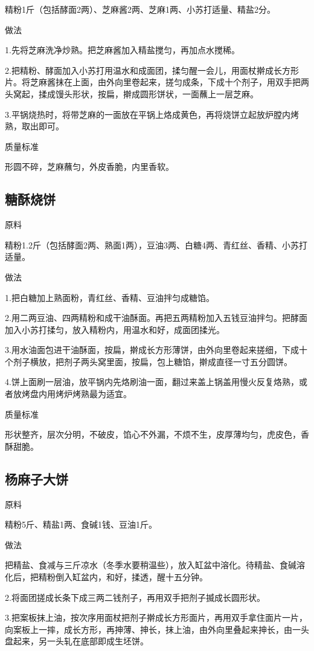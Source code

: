 \documentclass{ctexbook}
\begin{document}
精粉1斤（包括酵面2两）、芝麻酱2两、芝麻1两、小苏打适量、精盐2分。

做法

1.先将芝麻洗净炒熟。把芝麻酱加入精盐搅匀，再加点水搅稀。

2.把精粉、酵面加入小苏打用温水和成面团，揉匀醒一会儿，用面杖擀成长方形片。将芝麻酱抹在上面，由外向里卷起来，搓匀成条，下成十个剂子，用双手把两头窝起，揉成馒头形状，按扁，擀成圆形饼状，一面蘸上一层芝麻。

3.平锅烧热时，将带芝麻的一面放在平锅上烙成黄色，再将烧饼立起放炉膛内烤熟，取出即可。

质量标准

形圆不碎，芝麻蘸匀，外皮香脆，内里香软。
\subsection{糖酥烧饼}
原料

精粉1.2斤（包括酵面2两、熟面1两），豆油3两、白糖4两、青红丝、香精、小苏打适量。

做法

1.把白糖加上熟面粉，青红丝、香精、豆油拌匀成糖馅。

2.用二两豆油、四两精粉和成干油酥面。再把五两精粉加入五钱豆油拌匀。把酵面加入小苏打揉匀，放入精粉内，用温水和好，成面团揉光。

3.用水油面包进干油酥面，按扁，擀成长方形薄饼，由外向里卷起来搓细，下成十个剂子横放，把剂子两头窝里面，按扁，包上糖馅，擀成直径一寸五分圆饼。

4.饼上面刷一层油，放平锅内先烙刷油一面，翻过来盖上锅盖用慢火反复烙熟，或者放烤盘内用烤炉烤熟最为适宜。

质量标准

形状整齐，层次分明，不破皮，馅心不外漏，不烦不生，皮厚薄均匀，虎皮色，香酥甜脆。
\subsection{杨麻子大饼}
原料

精粉5斤、精盐1两、食碱1钱、豆油1斤。

做法

把精盐、食减与三斤凉水（冬季水要稍温些），放入缸盆中溶化。待精盐、食碱溶化后，把精粉倒入缸盆内，和好，揉透，醒十五分钟。

2.将面团搓成长条下成三两二钱剂子，再用双手把剂子揻成长圆形状。

3.把案板抹上油，按次序用面杖把剂子擀成长方形面片，再用双手拿住面片一片，向案板上一摔，成长方形，再抻薄、抻长，抹上油，由外向里叠起来抻长，由一头盘起来，另一头轧在底部即成生坯饼。
\end{document}
